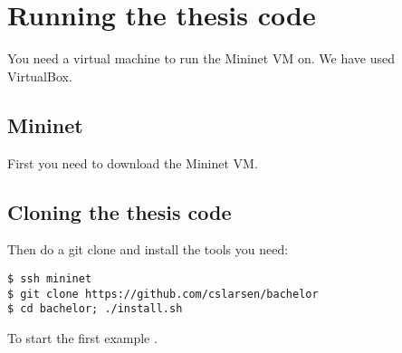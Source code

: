 \chapter{Running the thesis code}

You need a virtual machine to run the Mininet VM on.  We have used
VirtualBox.

\section{Mininet}

First you need to download the Mininet VM.

\section{Cloning the thesis code}

Then do a git clone and install the tools you need:

\begin{Verbatim}
$ ssh mininet
$ git clone https://github.com/cslarsen/bachelor
$ cd bachelor; ./install.sh
\end{Verbatim}

To start the first example .
